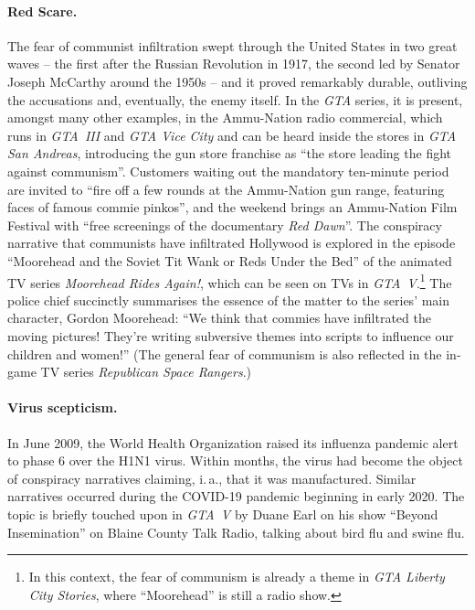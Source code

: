 \documentclass[]{scrartcl}
\begin{document}
\paragraph{Red Scare.}
The fear of communist infiltration swept through the United States in two great waves -- the first after the Russian Revolution in 1917, the second led by Senator Joseph McCarthy around the 1950s -- and it proved remarkably durable, outliving the accusations and, eventually, the enemy itself.
In the \textit{GTA} series, it is present, amongst many other examples, in the Ammu-Nation radio commercial, which runs in \textit{GTA~III} and \textit{GTA Vice City} and can be heard inside the stores in \textit{GTA San Andreas}, introducing the gun store franchise as \enquote{the store leading the fight against communism}.
Customers waiting out the mandatory ten-minute period are invited to \enquote{fire off a few rounds at the Ammu-Nation gun range, featuring faces of famous commie pinkos}, and the weekend brings an Ammu-Nation Film Festival with \enquote{free screenings of the documentary \textit{Red Dawn}}.
The conspiracy narrative that communists have infiltrated Hollywood is explored in the episode \enquote{Moorehead and the Soviet Tit Wank or Reds Under the Bed} of the animated TV series \textit{Moorehead Rides Again!}, which can be seen on TVs in \textit{GTA~V}.\footnote{In this context, the fear of communism is already a theme in \textit{GTA Liberty City Stories}, where \enquote{Moorehead} is still a radio show.}
The police chief succinctly summarises the essence of the matter to the series' main character, Gordon Moorehead:
\enquote{We think that commies have infiltrated the moving pictures!
They're writing subversive themes into scripts to influence our children and women!}
(The general fear of communism is also reflected in the in-game TV series \textit{Republican Space Rangers}.)

\paragraph{Virus scepticism.}
In June 2009, the World Health Organization raised its influenza pandemic alert to phase 6 over the H1N1 virus.
Within months, the virus had become the object of conspiracy narratives claiming, i.\,a., that it was manufactured.
Similar narratives occurred during the COVID-19 pandemic beginning in early 2020.
The topic is briefly touched upon in \textit{GTA~V} by Duane Earl on his show \enquote{Beyond Insemination} on Blaine County Talk Radio, talking about bird flu and swine flu.
\end{document}
